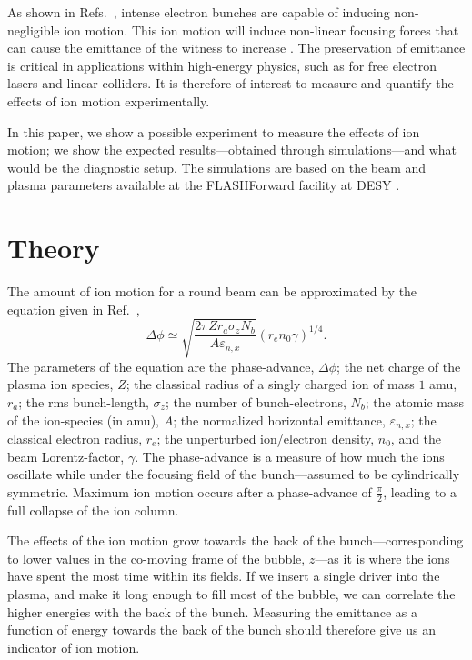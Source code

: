 \documentclass[a4paper,
               biblatex,     %
               ]{jacow}
\begin{document}
As shown in Refs.~\cite{Rosenzweig, Lee, Gholizadeh}, intense electron bunches are capable of inducing non-negligible ion motion. This ion motion will induce non-linear focusing forces that can cause the emittance of the witness to increase \cite{An}. The preservation of emittance is critical in applications within high-energy physics, such as for free electron lasers and linear colliders. It is therefore of interest to measure and quantify the effects of ion motion experimentally.


In this paper, we show a possible experiment to measure the effects of ion motion; we show the expected results---obtained through simulations---and what would be the diagnostic setup. The simulations are based on the beam and plasma parameters available at the FLASHForward facility at DESY \cite{Darcy}.

\section{Theory}
The amount of ion motion for a round beam can be approximated by the equation given in Ref.~\cite{Rosenzweig},
\begin{equation}
    \Delta \phi \simeq \sqrt{\frac{2\pi Z r_a \sigma_z N_b}{A\varepsilon_{n,x}}}\left(r_en_0\gamma\right)^{1/4}.
    \label{eq:ion_motion}
\end{equation}
The parameters of the equation are the phase-advance, $\Delta \phi$; the net charge of the plasma ion species, $Z$; the classical radius of a singly charged ion of mass $1$ amu, $r_a$; the rms bunch-length, $\sigma_z$; the number of bunch-electrons, $N_b$; the atomic mass of the ion-species (in amu), $A$; the normalized horizontal emittance, $\varepsilon_{n,x}$; the classical electron radius, $r_e$; the unperturbed ion/electron density, $n_0$, and the beam Lorentz-factor, $\gamma$. The phase-advance is a measure of how much the ions oscillate while under the focusing field of the bunch---assumed to be cylindrically symmetric. Maximum ion motion occurs after a phase-advance of $\frac{\pi}{2}$, leading to a full collapse of the ion column.

The effects of the ion motion grow towards the back of the bunch---corresponding to lower values in the co-moving frame of the bubble, $z$---as it is where the ions have spent the most time within its fields. If we insert a single driver into the plasma, and make it long enough to fill most of the bubble, we can correlate the higher energies with the back of the bunch. Measuring the emittance as a function of energy towards the back of the bunch should therefore give us an indicator of ion motion.
\end{document}
